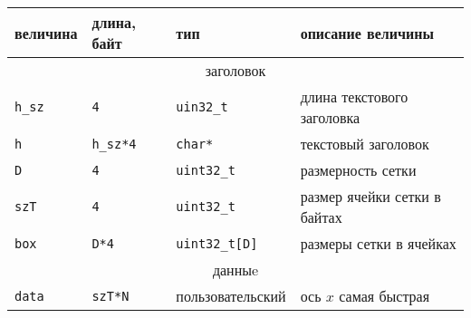 \documentclass[12pt]{article}
\begin{document}
\begin{center}
\begin{tabular}{|p{}|p{}|p{}|p{}|}
\hline
величина & длина, байт & тип & описание величины \\
\hline
\multicolumn{4}{|c|}{заголовок \rule{0pt}{.6cm}}\\
\hline
{\tt h\_sz} & {\tt 4} & {\tt uin32\_t} & длина текстового заголовка \\
{\tt h} & {\tt h\_sz*4} & {\tt char*} & текстовый заголовок \\
{\tt D} & {\tt 4} & {\tt uint32\_t} & размерность сетки\\
{\tt szT} & {\tt 4} & {\tt uint32\_t} & размер ячейки сетки в байтах\\
{\tt box} & {\tt D*4} & {\tt uint32\_t[D]} & размеры сетки в ячейках\\
\hline
\multicolumn{4}{|c|}{данныe \rule{0pt}{.6cm}}\\
\hline
{\tt data} & {\tt szT*N} & пользовательский & ось $x$ самая быстрая \\
\hline
\end{tabular}
\end{center}
\end{document}
